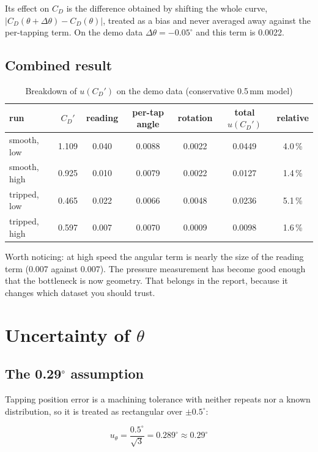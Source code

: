 \documentclass[11pt,a4paper]{article}
\newcommand{\CD}{\ensuremath{C_D}}
\begin{document}
Its effect on \CD{} is the difference obtained by shifting the whole curve,
$|\CD(\theta + \Delta\theta) - \CD(\theta)|$, treated as a bias and never averaged away against the
per-tapping term. On the demo data $\Delta\theta = -0.05^\circ$ and this term is 0.0022.

\subsection{Combined result}

\begin{table}[H]
\centering
\caption{Breakdown of $u(\CD')$ on the demo data (conservative 0.5\,mm model)}
\small
\begin{tabular}{@{}l c c c c c c@{}}
\toprule
run & $\CD'$ & reading & per-tap angle & rotation & total $u(\CD')$ & relative \\
\midrule
smooth, low & 1.109 & 0.040 & 0.0088 & 0.0022 & 0.0449 & 4.0\,\% \\
smooth, high & 0.925 & 0.010 & 0.0079 & 0.0022 & 0.0127 & 1.4\,\% \\
tripped, low & 0.465 & 0.022 & 0.0066 & 0.0048 & 0.0236 & 5.1\,\% \\
tripped, high & 0.597 & 0.007 & 0.0070 & 0.0009 & 0.0098 & 1.6\,\% \\
\bottomrule
\end{tabular}
\end{table}

Worth noticing: at high speed the angular term is nearly the size of the reading term (0.007 against
0.007). The pressure measurement has become good enough that the bottleneck is now geometry. That
belongs in the report, because it changes which dataset you should trust.

\section{Uncertainty of $\theta$}
\label{sec:theta}

\subsection{The 0.29$^\circ$ assumption}

Tapping position error is a machining tolerance with neither repeats nor a known distribution, so
it is treated as rectangular over $\pm0.5^\circ$:

\begin{equation}
u_\theta = \frac{0.5^\circ}{\sqrt{3}} = 0.289^\circ \approx 0.29^\circ
\end{equation}
\end{document}
